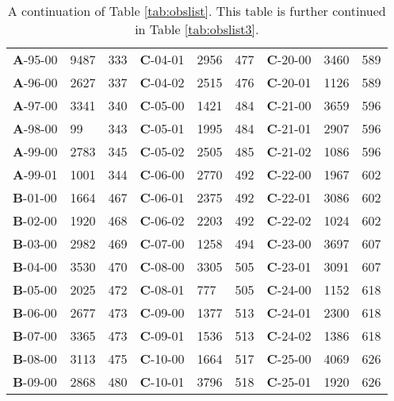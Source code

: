 \begin{table*}
\begin{tabular}{lllllllll}
\textbf{A}-95-00&9487&333&\textbf{C}-04-01&2956&477&\textbf{C}-20-00&3460&589\\
\textbf{A}-96-00&2627&337&\textbf{C}-04-02&2515&476&\textbf{C}-20-01&1126&589\\
\textbf{A}-97-00&3341&340&\textbf{C}-05-00&1421&484&\textbf{C}-21-00&3659&596\\
\textbf{A}-98-00&99&343&\textbf{C}-05-01&1995&484&\textbf{C}-21-01&2907&596\\
\textbf{A}-99-00&2783&345&\textbf{C}-05-02&2505&485&\textbf{C}-21-02&1086&596\\
\textbf{A}-99-01&1001&344&\textbf{C}-06-00&2770&492&\textbf{C}-22-00&1967&602\\
\textbf{B}-01-00&1664&467&\textbf{C}-06-01&2375&492&\textbf{C}-22-01&3086&602\\
\textbf{B}-02-00&1920&468&\textbf{C}-06-02&2203&492&\textbf{C}-22-02&1024&602\\
\textbf{B}-03-00&2982&469&\textbf{C}-07-00&1258&494&\textbf{C}-23-00&3697&607\\
\textbf{B}-04-00&3530&470&\textbf{C}-08-00&3305&505&\textbf{C}-23-01&3091&607\\
\textbf{B}-05-00&2025&472&\textbf{C}-08-01&777&505&\textbf{C}-24-00&1152&618\\
\textbf{B}-06-00&2677&473&\textbf{C}-09-00&1377&513&\textbf{C}-24-01&2300&618\\
\textbf{B}-07-00&3365&473&\textbf{C}-09-01&1536&513&\textbf{C}-24-02&1386&618\\
\textbf{B}-08-00&3113&475&\textbf{C}-10-00&1664&517&\textbf{C}-25-00&4069&626\\
\textbf{B}-09-00&2868&480&\textbf{C}-10-01&3796&518&\textbf{C}-25-01&1920&626\\
\hline
\hline
\end{tabular}
\caption[]{A continuation of Table \ref{tab:obslist}.  This table is further continued in Table \ref{tab:obslist3}.}
\label{tab:obslist2}
\end{table*}

